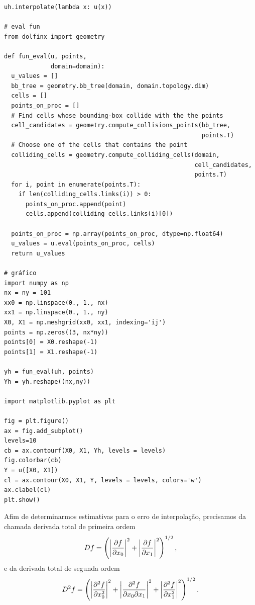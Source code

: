 \begin{ex}
\begin{lstlisting}[caption=interp2d.py, label=cap_mef2d_sec_interp:cod:interp2d]
uh.interpolate(lambda x: u(x))

# eval fun
from dolfinx import geometry

def fun_eval(u, points,
             domain=domain):
  u_values = []
  bb_tree = geometry.bb_tree(domain, domain.topology.dim)
  cells = []
  points_on_proc = []
  # Find cells whose bounding-box collide with the the points
  cell_candidates = geometry.compute_collisions_points(bb_tree, 
                                                       points.T)
  # Choose one of the cells that contains the point
  colliding_cells = geometry.compute_colliding_cells(domain, 
                                                     cell_candidates, 
                                                     points.T)
  for i, point in enumerate(points.T):
    if len(colliding_cells.links(i)) > 0:
      points_on_proc.append(point)
      cells.append(colliding_cells.links(i)[0])

  points_on_proc = np.array(points_on_proc, dtype=np.float64)
  u_values = u.eval(points_on_proc, cells)
  return u_values

# gráfico
import numpy as np
nx = ny = 101
xx0 = np.linspace(0., 1., nx)
xx1 = np.linspace(0., 1., ny)
X0, X1 = np.meshgrid(xx0, xx1, indexing='ij')
points = np.zeros((3, nx*ny))
points[0] = X0.reshape(-1)
points[1] = X1.reshape(-1)

yh = fun_eval(uh, points)
Yh = yh.reshape((nx,ny))

import matplotlib.pyplot as plt

fig = plt.figure()
ax = fig.add_subplot()
levels=10
cb = ax.contourf(X0, X1, Yh, levels = levels)
fig.colorbar(cb)
Y = u([X0, X1])
cl = ax.contour(X0, X1, Y, levels = levels, colors='w')
ax.clabel(cl)
plt.show()
\end{lstlisting}
\end{ex}

Afim de determinarmos estimativas para o erro de interpolação, precisamos da chamada derivada total de primeira ordem
\begin{equation}
  Df = \left(\left|\frac{\partial f}{\partial x_0}\right|^2 + \left|\frac{\partial f}{\partial x_1}\right|^2\right)^{1/2},
\end{equation}
e da derivada total de segunda ordem
\begin{equation}
  D^2f = \left(\left|\frac{\partial^2 f}{\partial x_0^2}\right|^2 + \left|\frac{\partial^2 f}{\partial x_0\partial x_1}\right|^2 + \left|\frac{\partial^2 f}{\partial x_1^2}\right|^2\right)^{1/2}.
\end{equation}


